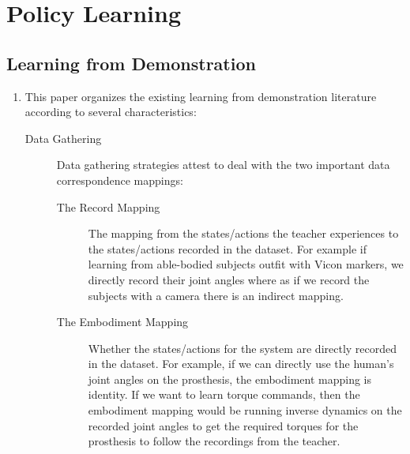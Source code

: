 \chapter{Policy Learning} \label{ch:Policy Learning}

\section{Learning from Demonstration} \label{sec:Learning from Demonstration}

\begin{enumerate} 

    \item {}

    This paper organizes the existing learning from demonstration literature
    according to several characteristics:

    \begin{description} 
        \item[Data Gathering] 
            Data gathering strategies attest to deal with the two important
            data correspondence mappings:
            \begin{description} 
                \item[The Record Mapping] 
                    The mapping from the states/actions the teacher experiences
                    to the states/actions recorded in the dataset. For example
                    if learning from able-bodied subjects outfit with Vicon
                    markers, we directly record their joint angles where as if
                    we record the subjects with a camera there is an indirect
                    mapping.
                \item[The Embodiment Mapping] 
                    Whether the states/actions for the system are directly
                    recorded in the dataset. For example, if we can directly use
                    the human's joint angles on the prosthesis, the embodiment
                    mapping is identity. If we want to learn torque commands,
                    then the embodiment mapping would be running inverse
                    dynamics on the recorded joint angles to get the required
                    torques for the prosthesis to follow the recordings from the
                    teacher.
            \end{description} 


\end{description}
\end{enumerate}
